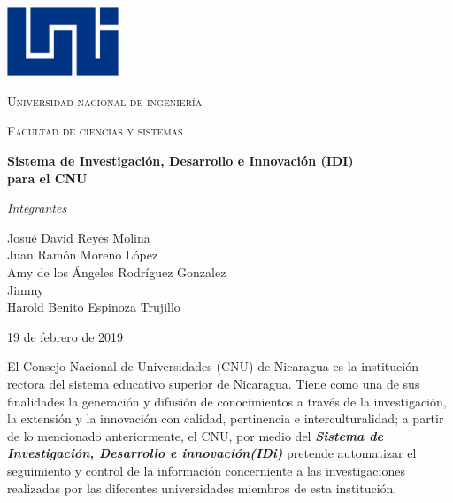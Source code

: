 \documentclass[12pt,letterpaper]{report}
\begin{document}
\begin{titlepage}
	\centering
	\includegraphics[width=0.25\textwidth]{img/logo.png}\par\vspace{1cm}
	{\scshape\LARGE Universidad nacional de ingeniería \par}
	\vspace{0.25cm}
	{\scshape\Large Facultad de ciencias y sistemas\par}
	\vspace{2.5cm}
	{\large\bfseries Sistema de Investigación, Desarrollo e Innovación (IDI)\\ para el CNU\par}
	\vspace{2cm}

	\vfill
	\begin{center}
		{\Large\itshape Integrantes\par}\vspace{0.5cm}
		Josué David Reyes Molina\\ \vspace{0.15cm}
		Juan Ramón Moreno López\\ \vspace{0.15cm}
		Amy de los Ángeles Rodríguez Gonzalez\\ \vspace{0.15cm}
		Jimmy\\ \vspace{0.15cm}
		Harold Benito Espinoza Trujillo\\ \vspace{0.15cm}
	\end{center}
	\vfill

	{\large 19 de febrero de 2019\par}
\end{titlepage}

El Consejo Nacional de Universidades (CNU) de Nicaragua es la institución rectora del sistema educativo superior de Nicaragua. Tiene como una de sus finalidades la generación y difusión de conocimientos a través de la investigación, la extensión y la innovación con calidad, pertinencia e interculturalidad; a partir de lo mencionado anteriormente, el CNU, por medio del \textbf{\emph{Sistema de Investigación, Desarrollo e innovación(IDi)}} pretende automatizar el seguimiento y control de la información concerniente a las investigaciones realizadas por las diferentes universidades miembros de esta institución.
\end{document}
